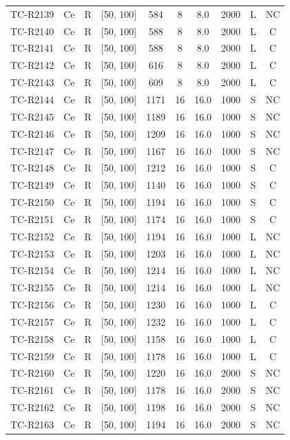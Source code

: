 \begin{longtable}{lccccccccc}
TC-R2139 & Ce & R & [50, 100] & 584 & 8 & 8.0 & 2000 & L & NC \\
TC-R2140 & Ce & R & [50, 100] & 588 & 8 & 8.0 & 2000 & L & C \\
TC-R2141 & Ce & R & [50, 100] & 588 & 8 & 8.0 & 2000 & L & C \\
TC-R2142 & Ce & R & [50, 100] & 616 & 8 & 8.0 & 2000 & L & C \\
TC-R2143 & Ce & R & [50, 100] & 609 & 8 & 8.0 & 2000 & L & C \\
TC-R2144 & Ce & R & [50, 100] & 1171 & 16 & 16.0 & 1000 & S & NC \\
TC-R2145 & Ce & R & [50, 100] & 1189 & 16 & 16.0 & 1000 & S & NC \\
TC-R2146 & Ce & R & [50, 100] & 1209 & 16 & 16.0 & 1000 & S & NC \\
TC-R2147 & Ce & R & [50, 100] & 1167 & 16 & 16.0 & 1000 & S & NC \\
TC-R2148 & Ce & R & [50, 100] & 1212 & 16 & 16.0 & 1000 & S & C \\
TC-R2149 & Ce & R & [50, 100] & 1140 & 16 & 16.0 & 1000 & S & C \\
TC-R2150 & Ce & R & [50, 100] & 1194 & 16 & 16.0 & 1000 & S & C \\
TC-R2151 & Ce & R & [50, 100] & 1174 & 16 & 16.0 & 1000 & S & C \\
TC-R2152 & Ce & R & [50, 100] & 1194 & 16 & 16.0 & 1000 & L & NC \\
TC-R2153 & Ce & R & [50, 100] & 1203 & 16 & 16.0 & 1000 & L & NC \\
TC-R2154 & Ce & R & [50, 100] & 1214 & 16 & 16.0 & 1000 & L & NC \\
TC-R2155 & Ce & R & [50, 100] & 1214 & 16 & 16.0 & 1000 & L & NC \\
TC-R2156 & Ce & R & [50, 100] & 1230 & 16 & 16.0 & 1000 & L & C \\
TC-R2157 & Ce & R & [50, 100] & 1232 & 16 & 16.0 & 1000 & L & C \\
TC-R2158 & Ce & R & [50, 100] & 1158 & 16 & 16.0 & 1000 & L & C \\
TC-R2159 & Ce & R & [50, 100] & 1178 & 16 & 16.0 & 1000 & L & C \\
TC-R2160 & Ce & R & [50, 100] & 1220 & 16 & 16.0 & 2000 & S & NC \\
TC-R2161 & Ce & R & [50, 100] & 1178 & 16 & 16.0 & 2000 & S & NC \\
TC-R2162 & Ce & R & [50, 100] & 1198 & 16 & 16.0 & 2000 & S & NC \\
TC-R2163 & Ce & R & [50, 100] & 1194 & 16 & 16.0 & 2000 & S & NC \\

\end{longtable}

